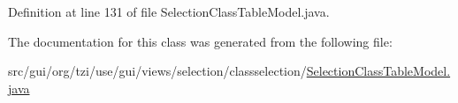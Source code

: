 Definition at line 131 of file Selection\-Class\-Table\-Model.\-java.



The documentation for this class was generated from the following file\-:\begin{DoxyCompactItemize}
\item 
src/gui/org/tzi/use/gui/views/selection/classselection/\hyperlink{_selection_class_table_model_8java}{Selection\-Class\-Table\-Model.\-java}\end{DoxyCompactItemize}
